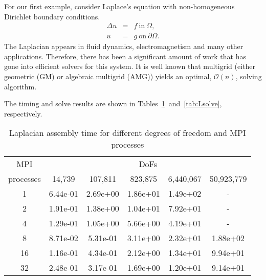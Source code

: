 \documentclass[10pt]{article}
\begin{document}
For our first example, consider Laplace's equation with non-homogeneous Dirichlet boundary conditions.
\begin{equation} \label{eq:Lapl}
    \begin{array}{rcl}
        \Delta u &=& f \ \mbox{in} \ \Omega,\\
        u &=& g \ \mbox{on} \ \partial\Omega.
    \end{array}
\end{equation}
The Laplacian appears in fluid dynamics, electromagnetism and many other applications. Therefore, there has been a significant amount of work that has gone into efficient solvers for this system. It is well known that multigrid (either geometric (GM) or algebraic multigrid (AMG)) yields an optimal, $\mathcal{O}(n)$, solving algorithm.

The timing and solve results are shown in Tables~\ref{tab:Ltime}~and~\ref{tab:Lsolve}, respectively.
\begin{table}[h!]
    \centering
    \begin{tabular}{|c|ccccc|}
        \hline
        MPI & \multicolumn{5}{c|}{DoFs}\\
        processes &  14,739   &   107,811  &   823,875  &   6,440,067  & 50,923,779 \\
        \hline
            1  & 6.44e-01 &  2.69e+00 &  1.86e+01 &  1.49e+02 & - \\
            2  & 1.91e-01 &  1.38e+00 &  1.04e+01 &  7.92e+01 & - \\
            4  & 1.29e-01 &  1.05e+00 &  5.66e+00 &  4.19e+01 & - \\
            8  & 8.71e-02 &  5.31e-01 &  3.11e+00 &  2.32e+01 & 1.88e+02 \\
            16 & 1.16e-01 &  4.34e-01 &  2.12e+00 &  1.34e+01 & 9.94e+01 \\
            32 & 2.48e-01 &  3.17e-01 &  1.69e+00 &  1.20e+01 & 9.14e+01 \\
        \hline
    \end{tabular}
    \caption{Laplacian assembly time for different degrees of freedom and MPI processes}
    \label{tab:Ltime}
\end{table}
\end{document}
